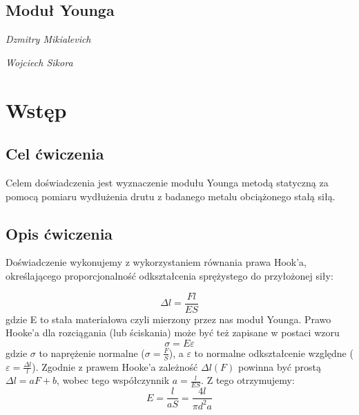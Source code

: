 \documentclass[]{article}
\begin{document}
\begin{figure}[tp!]
\end{figure}

\begin{center}
	\section*{Moduł Younga}
	\emph{Dzmitry Mikialevich}
\end{center}
\begin{center}
	\emph{Wojciech Sikora}
\end{center}
\tableofcontents
\newpage

\section{Wstęp}

\subsection{Cel ćwiczenia}
Celem doświadczenia jest wyznaczenie modułu Younga metodą statyczną za pomocą pomiaru
wydłużenia drutu z badanego metalu obciążonego stałą siłą.

    
\subsection{Opis ćwiczenia}
Doświadczenie wykonujemy z wykorzystaniem równania prawa Hook'a, określającego proporcjonalność odkształcenia sprężystego do przyłożonej siły:
\newline

\[\Delta l = \frac{Fl}{ES} \]
gdzie E to stała materiałowa czyli mierzony przez nas moduł Younga.
\newline
\newline
Prawo Hooke’a dla rozciągania (lub ściskania) może być też zapisane w postaci wzoru
\[\sigma=E\varepsilon\]
gdzie \(\sigma\) to naprężenie normalne (\(\sigma=\frac{F}{S}\)), a \(\varepsilon\) to normalne odkształcenie względne (\(\varepsilon = \frac{\Delta l}{l}\)).
\newline
\newline
Zgodnie z prawem Hooke'a zależność \(\Delta l (F)\) powinna być prostą \(\Delta l = aF + b\), wobec tego współczynnik \(a = \frac{l}{ES}\). Z tego otrzymujemy:
\[E=\frac{l}{aS}=\frac{4l}{\pi d^2 a}\]
\end{document}
